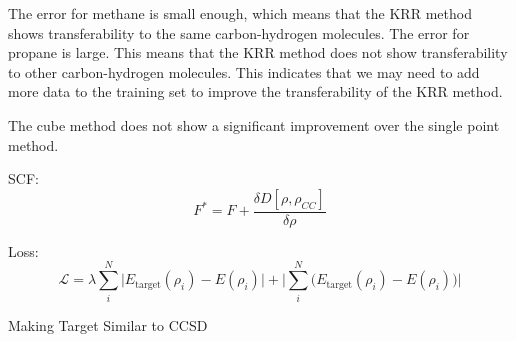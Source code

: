 \documentclass[%
twocolumn,
amsmath,amssymb,
groupedaddress,
reprint,%
]{revtex4-2}
\renewcommand{\>}{\rangle}
\newcommand{\<}{\langle}
\begin{document}
The error for methane is small enough, which means that the KRR method shows transferability to the same carbon-hydrogen molecules.
% 
The error for propane is large. This means that the KRR method does not show transferability to other carbon-hydrogen molecules.
% 
This indicates that we may need to add more data to the training set to improve the transferability of the KRR method.

The cube method does not show a significant improvement over the single point method.


SCF:
\begin{equation}
	F^{\ast} = F + \frac{\delta D[\rho, \rho_{CC}]}{\delta \rho}
\end{equation}

Loss:
\begin{equation}
	\mathcal{L} = \lambda \sum_{i}^{N} \big| E_{\mathrm{target}}(\rho_{i}) - E(\rho_{i}) \big| + \Big| \sum_{i}^{N} \big( E_{\mathrm{target}}(\rho_{i}) - E(\rho_{i}) \big) \Big|
\end{equation}

Making Target Similar to CCSD
\end{document}
